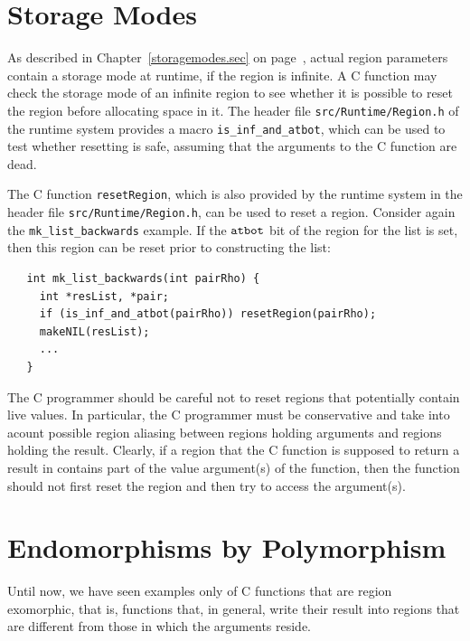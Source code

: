 \documentclass[12pt]{book}
\begin{document}
\section{Storage Modes}
As described in Chapter~\ref{storagemodes.sec} on
page~\pageref{atbit.lab}, actual region parameters contain a storage
mode at runtime, if the region is infinite.  A C function may check
the storage mode of an infinite region to see whether it is possible
to reset the region before allocating space in it. The header file
{\tt src/Runtime/Region.h} of the runtime system provides a macro
%
\verb|is_inf_and_atbot|, which can be used to test whether resetting
is safe, assuming that the arguments to the C function are dead.

The C function \texttt{resetRegion}, which is also provided by the
runtime system in the header file {\tt src/Runtime/Region.h}, can be
used to reset a region. Consider again the \verb|mk_list_backwards|
example. If the $\hbox{\tt atbot}$ bit of the region for the list is set, then
this region can be reset prior to constructing the list:
%
\begin{verbatim}
   int mk_list_backwards(int pairRho) {
     int *resList, *pair;
     if (is_inf_and_atbot(pairRho)) resetRegion(pairRho);
     makeNIL(resList);  
     ...
   }
\end{verbatim}
The C programmer should be careful not to reset regions that
potentially contain live values. In particular, the C programmer must be
conservative and take into acount possible region aliasing between
regions holding arguments and regions holding the result. 
Clearly, if a region that the C function is supposed to
return a result in contains part of the value argument(s) of the function,
then the function should not first reset the region and 
then try to access the argument(s).

\section{Endomorphisms by Polymorphism}
\label{C_polymorphism.sec}
Until now, we have seen examples only of C functions that are region
exomorphic, that is, functions that, in general, write their result
into regions that are different from those in which the arguments
reside.
\end{document}
